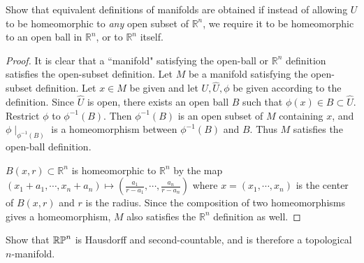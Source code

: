 \begin{customexer}{1.1}
  Show that equivalent definitions of manifolds are obtained if instead of allowing $U$ to be homeomorphic to \textit{any} open subset of $\mathbb{R}^n$, we require it to be homeomorphic to an open ball in $\mathbb{R}^n$, or to $\mathbb{R}^n$ itself.
\end{customexer}

\begin{proof}
  It is clear that a ``manifold" satisfying the open-ball or $\mathbb{R}^n$ definition satisfies the open-subset definition.
  Let $M$ be a manifold satisfying the open-subset definition.
  Let $x \in M$ be given and let $U, \hat{U}, \phi$ be given according to the definition.
  Since $\hat{U}$ is open, there exists an open ball $B$ such that $\phi(x) \in B \subset \hat{U}$.
  Restrict $\phi$ to $\phi^{-1}(B)$.
  Then $\phi^{-1}(B)$ is an open subset of $M$ containing $x$, and $\phi\mid_{\phi^{-1}(B)}$ is a homeomorphism between $\phi^{-1}(B)$ and $B$.
  Thus $M$ satisfies the open-ball definition.

  $B(x, r) \subset \mathbb{R}^n$ is homeomorphic to $\mathbb{R}^n$ by the map $(x_1 + a_1, \cdots, x_n + a_n) \mapsto (\frac{a_1}{r - a_1}, \cdots, \frac{a_n}{r - a_n})$ where $x = (x_1, \cdots, x_n)$ is the center of $B(x, r)$ and $r$ is the radius.
  Since the composition of two homeomorphisms gives a homeomorphism, $M$ also satisfies the $\mathbb{R}^n$ definition as well.
\end{proof}


\begin{customexer}{1.6}
  Show that $\operatorname{\mathbb{R}\mathbb{P}}^n$ is Hausdorff and second-countable, and is therefore a topological $n$-manifold.
\end{customexer}

